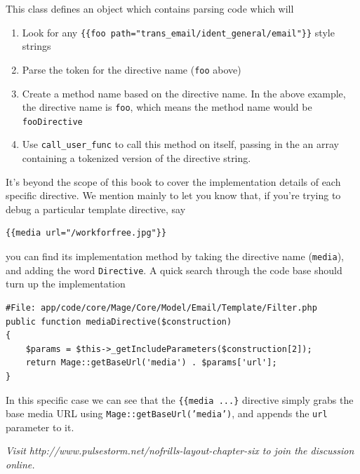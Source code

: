 \documentclass[oneside]{book}
\begin{document}
This class defines an object which contains parsing code which will 

\begin{enumerate}
\item Look for any \footnotesize\texttt{\{\{foo path="trans\_email/ident\_general/email"\}\}} \normalsize  style strings
\item Parse the token for the directive name (\footnotesize\texttt{foo} \normalsize  above) 
\item Create a method name based on the directive name.  In the above example, the directive name is \footnotesize\texttt{foo}\normalsize, which means the method name would be \footnotesize\texttt{fooDirective} \normalsize 
\item Use \footnotesize\texttt{call\_user\_func} \normalsize  to call this method on itself, passing in the an array containing a tokenized version of the directive string.
\end{enumerate}


It's beyond the scope of this book to cover the implementation details of each specific directive.  We mention mainly to let you know that, if you're trying to debug a particular template directive, say 

\begin{lstlisting}
{{media url="/workforfree.jpg"}}

\end{lstlisting}


you can find its implementation method by taking the directive name (\footnotesize\texttt{media}\normalsize), and adding the word \footnotesize\texttt{Directive}\normalsize.  A quick search through the code base should turn up the implementation 

\begin{lstlisting}
#File: app/code/core/Mage/Core/Model/Email/Template/Filter.php
public function mediaDirective($construction)
{
    $params = $this->_getIncludeParameters($construction[2]);
    return Mage::getBaseUrl('media') . $params['url'];
}

\end{lstlisting}


In this specific case we can see that the \footnotesize\texttt{\{\{media ...\}} \normalsize  directive simply grabs the base media URL using \footnotesize\texttt{Mage::getBaseUrl('media')}\normalsize, and appends the \footnotesize\texttt{url} \normalsize  parameter to it.

\emph{Visit http://www.pulsestorm.net/nofrills-layout-chapter-six to join the discussion online.}
\end{document}
